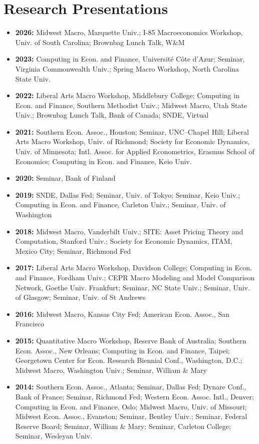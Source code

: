\documentclass[10pt,letterpaper,en-US]{article}
\begin{document}
\section*{Research Presentations}
\begin{itemize}
\item \textbf{2026:} Midwest Macro, Marquette Univ.; I-85 Macroeconomics Workshop, Univ. of South Carolina; Brownbag Lunch Talk, W\&M
\item \textbf{2023:} Computing in Econ. and Finance, Universit\'{e} C\^{o}te d'Azur; Seminar, Virginia Commonwealth Univ.; Spring Macro Workshop, North Carolina State Univ.
\item \textbf{2022:} Liberal Arts Macro Workshop, Middlebury College; Computing in Econ. and Finance, Southern Methodist Univ.; Midwest Macro, Utah State Univ.; Brownbag Lunch Talk, Bank of Canada; SNDE, Virtual
\item \textbf{2021:} Southern Econ. Assoc., Houston; Seminar, UNC--Chapel Hill; Liberal Arts Macro Workshop, Univ. of Richmond; Society for Economic Dynamics, Univ. of Minnesota; Intl. Assoc. for Applied Econometrics, Erasmus School of Economics; Computing in Econ. and Finance, Keio Univ.
\item \textbf{2020:} Seminar, Bank of Finland
\item \textbf{2019:} SNDE, Dallas Fed; Seminar, Univ. of Tokyo; Seminar, Keio Univ.; Computing in Econ. and Finance, Carleton Univ.; Seminar, Univ. of Washington
\item \textbf{2018:} Midwest Macro, Vanderbilt Univ.; SITE: Asset Pricing Theory and Computation, Stanford Univ.; Society for Economic Dynamics, ITAM, Mexico City; Seminar, Richmond Fed
\item \textbf{2017:} Liberal Arts Macro Workshop, Davidson College; Computing in Econ. and Finance, Fordham Univ.; CEPR Macro Modeling and Model Comparison Network, Goethe Univ. Frankfurt; Seminar, NC State Univ.; Seminar, Univ. of Glasgow; Seminar, Univ. of St Andrews
\item \textbf{2016:} Midwest Macro, Kansas City Fed; American Econ. Assoc., San Francisco
\item \textbf{2015:} Quantitative Macro Workshop, Reserve Bank of Australia; Southern Econ. Assoc., New Orleans; Computing in Econ. and Finance, Taipei; Georgetown Center for Econ. Research Biennial Conf., Washington, D.C.; Midwest Macro, Washington Univ.; Seminar, William \& Mary
\item \textbf{2014:} Southern Econ. Assoc., Atlanta; Seminar, Dallas Fed; Dynare Conf., Bank of France; Seminar, Richmond Fed; Western Econ. Assoc. Intl., Denver; Computing in Econ. and Finance, Oslo; Midwest Macro, Univ. of Missouri; Midwest Econ. Assoc., Evanston; Seminar, Bentley Univ.; Seminar, Federal Reserve Board; Seminar, William \& Mary; Seminar, Carleton College; Seminar, Wesleyan Univ.

\end{itemize}
\end{document}
